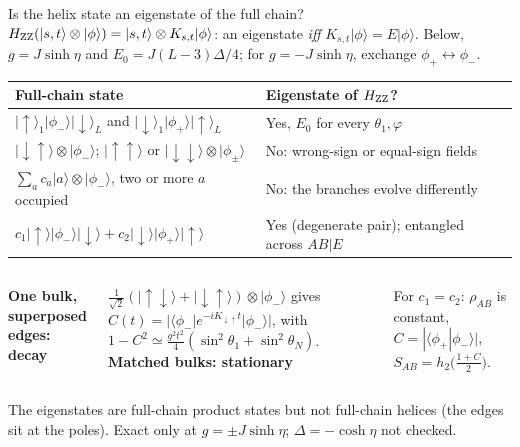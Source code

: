 \documentclass[aspectratio=169,10pt]{beamer}
\newcommand{\ket}[1]{\lvert #1\rangle}
\newcommand{\bra}[1]{\langle #1\rvert}
\newcommand{\sechead}[1]{{\color{sea}\bfseries #1}\par\vspace{1mm}}
\newcommand{\noteinline}[1]{{\color{muted}\footnotesize #1}}
\begin{document}
\begin{frame}{Is the helix state an eigenstate of the full chain?}
\(H_{\rm ZZ}(\ket{s,t}\otimes\ket\phi)=\ket{s,t}\otimes K_{s,t}\ket\phi\): an eigenstate \emph{iff} \(K_{s,t}\ket\phi=E\ket\phi\). Below, \(g=J\sinh\eta\) and \(E_0=J(L-3)\Delta/4\); for \(g=-J\sinh\eta\), exchange \(\phi_+\leftrightarrow\phi_-\).
\par\vspace{.03cm}
\renewcommand{\arraystretch}{1.08}
{\footnotesize
\begin{tabular}{@{}>{\raggedright\arraybackslash}p{6.6cm}>{\raggedright\arraybackslash}p{7.1cm}@{}}
\toprule
\textbf{Full-chain state} & \textbf{Eigenstate of \(H_{\rm ZZ}\)?}\\
\midrule
\(\ket{\uparrow}_1\ket{\phi_-}\ket{\downarrow}_L\) and \(\ket{\downarrow}_1\ket{\phi_+}\ket{\uparrow}_L\) & Yes, \(E_0\) for every \(\theta_1,\varphi\)\\
\(\ket{\downarrow\uparrow}\otimes\ket{\phi_-}\); \(\ket{\uparrow\uparrow}\) or \(\ket{\downarrow\downarrow}\otimes\ket{\phi_\pm}\) & No: wrong-sign or equal-sign fields\\
\(\sum_a c_a\ket a\otimes\ket{\phi_-}\), two or more \(a\) occupied & No: the branches evolve differently\\
\(c_1\ket{\uparrow}\ket{\phi_-}\ket{\downarrow}+c_2\ket{\downarrow}\ket{\phi_+}\ket{\uparrow}\) & Yes (degenerate pair); entangled across \(AB|E\)\\
\bottomrule
\end{tabular}
}
\par\vspace{.3cm}
\begin{columns}[T,onlytextwidth]
\sechead{One bulk, superposed edges: decay}
\(\tfrac{1}{\sqrt2}(\ket{\uparrow\downarrow}+\ket{\downarrow\uparrow})\otimes\ket{\phi_-}\) gives \(C(t)=\bigl|\bra{\phi_-}e^{-iK_{\downarrow\uparrow}t}\ket{\phi_-}\bigr|\), with \(1-C^2\simeq\tfrac{g^2t^2}{4}(\sin^2\theta_1+\sin^2\theta_N)\).
\sechead{Matched bulks: stationary}
For \(c_1=c_2\): \(\rho_{AB}\) is constant, \(C=|\langle\phi_+|\phi_-\rangle|\), \(S_{AB}=h_2\bigl(\tfrac{1+C}{2}\bigr)\).
\end{columns}
\vspace{.04cm}
\noteinline{The eigenstates are full-chain product states but not full-chain helices (the edges sit at the poles). Exact only at \(g=\pm J\sinh\eta\); \(\Delta=-\cosh\eta\) not checked.}
\end{frame}
\end{document}
